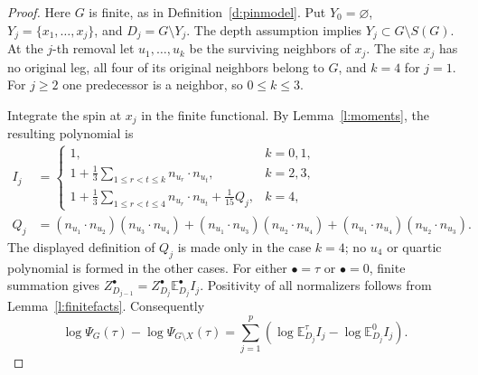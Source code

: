 \begin{proof}
Here \(G\) is finite, as in Definition~\ref{d:pinmodel}.
Put \(Y_0=\varnothing\), \(Y_j=\{x_1,\ldots,x_j\}\), and
\(D_j=G\setminus Y_j\).  The depth assumption implies
\(Y_j\subset G\setminus S(G)\).  At the \(j\)-th removal let
\(u_1,\ldots,u_k\) be the surviving neighbors of \(x_j\).
The site \(x_j\) has no original leg, all four of its original
neighbors belong to \(G\), and \(k=4\) for \(j=1\).
For \(j\ge2\) one predecessor is a neighbor, so \(0\le k\le3\).

Integrate the spin at \(x_j\) in the finite functional.  By
Lemma~\ref{l:moments}, the resulting polynomial is
\begin{equation}\label{e:removalpolynomial}
 \begin{split}
 I_j&=\begin{cases}
 1,&k=0,1,\\
 1+\frac13\displaystyle\sum_{1\le r<t\le k}n_{u_r}\cdot n_{u_t},
       &k=2,3,\\
 1+\frac13\displaystyle\sum_{1\le r<t\le4}n_{u_r}\cdot n_{u_t}
                    +\frac1{15}Q_j,&k=4,
 \end{cases}\\
 Q_j&=(n_{u_1}\cdot n_{u_2})(n_{u_3}\cdot n_{u_4})
      +(n_{u_1}\cdot n_{u_3})(n_{u_2}\cdot n_{u_4})
      +(n_{u_1}\cdot n_{u_4})(n_{u_2}\cdot n_{u_3}).
 \end{split}
\end{equation}
The displayed definition of \(Q_j\) is made only in the case
\(k=4\); no \(u_4\) or quartic polynomial is formed in the other
cases.  For either
\(\bullet=\tau\) or \(\bullet=0\), finite summation gives
\(Z_{D_{j-1}}^\bullet=Z_{D_j}^\bullet
\mathbb E_{D_j}^\bullet I_j\).  Positivity of all normalizers
follows from Lemma~\ref{l:finitefacts}.  Consequently
\begin{equation}\label{e:removaltelescope}
 \log\Psi_G(\tau)-\log\Psi_{G\setminus X}(\tau)
   =\sum_{j=1}^p
      \left(\log\mathbb E_{D_j}^\tau I_j
                         -\log\mathbb E_{D_j}^0 I_j\right).
\end{equation}


\end{proof}
